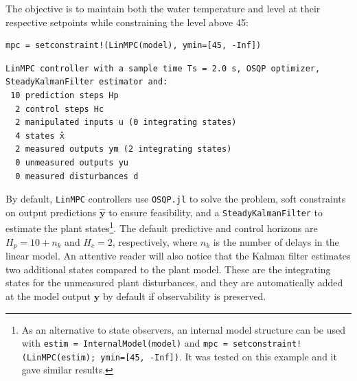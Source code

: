 The objective is to maintain both the water temperature and level at their respective setpoints while constraining the level above 45:
\begin{verbatim}
mpc = setconstraint!(LinMPC(model), ymin=[45, -Inf])
\end{verbatim}
\spacerepl
\begin{verbatim}
LinMPC controller with a sample time Ts = 2.0 s, OSQP optimizer,
SteadyKalmanFilter estimator and:
 10 prediction steps Hp
  2 control steps Hc
  2 manipulated inputs u (0 integrating states)
  4 states x̂
  2 measured outputs ym (2 integrating states)
  0 unmeasured outputs yu
  0 measured disturbances d
\end{verbatim}
By default, \texttt{LinMPC} controllers use \texttt{OSQP.jl} \citep{osqp} to solve the problem, soft constraints on output predictions $\mathbf{\hat y}$ to ensure feasibility, and a \texttt{SteadyKalmanFilter} to estimate the plant states\footnote{As an alternative to state observers, an internal model structure can be used with \texttt{estim = InternalModel(model)} and \texttt{mpc = setconstraint!(LinMPC(estim); ymin=[45, -Inf])}. It was tested on this example and it gave similar results.}. The default predictive and control horizons are $H_p = 10 + n_k$ and $H_c = 2$, respectively, where $n_k$ is the number of delays in the linear model. An attentive reader will also notice that the Kalman filter estimates two additional states compared to the plant model. These are the integrating states for the unmeasured plant disturbances, and they are automatically added at the model output $\mathbf{y}$ by default if observability is preserved.

